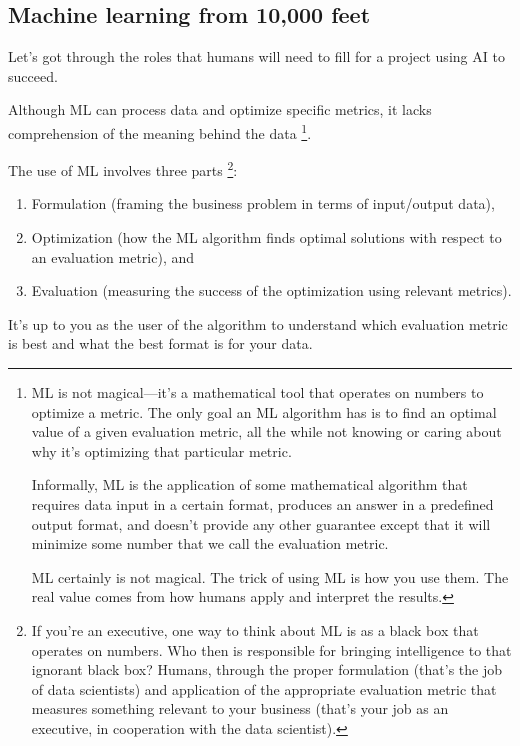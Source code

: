 \subsection{Machine learning from 10,000 feet}
Let's got through the roles that humans will need to fill for a
project using AI to succeed.

Although ML can process data and optimize specific metrics, it
lacks comprehension of the meaning behind the data
\footnote{
    ML is not magical—it's a mathematical tool that operates on
    numbers to optimize a metric. The only goal an ML algorithm
    has is to find an optimal value of a given evaluation
    metric, all the while not knowing or caring about why it's
    optimizing that particular metric.

    Informally, ML is the application of some mathematical
    algorithm that requires data input in a certain format,
    produces an answer in a predefined output format, and
    doesn't provide any other guarantee except that it will
    minimize some number that we call the evaluation metric.

    ML certainly is not magical. The trick of using ML is how
    you use them. The real value comes from how humans apply
    and interpret the results.
}.

The use of ML involves three parts
\footnote{
    If you're an executive, one way to think about ML is as a
    black box that operates on numbers. Who then is responsible
    for bringing intelligence to that ignorant black box?
    Humans, through the proper formulation (that's the job of
    data scientists) and application of the appropriate
    evaluation metric that measures something relevant to your
    business (that's your job as an executive, in cooperation
    with the data scientist).
}: 
\begin{enumerate}
    \item Formulation (framing the business problem in terms of
    input/output data),
    
    \item Optimization (how the ML algorithm finds optimal
    solutions with respect to an evaluation metric), and
    
    \item Evaluation (measuring the success of the optimization
    using relevant metrics).
\end{enumerate}
It's up to you as the user of the algorithm to understand which
evaluation metric is best and what the best format is for your
data.

